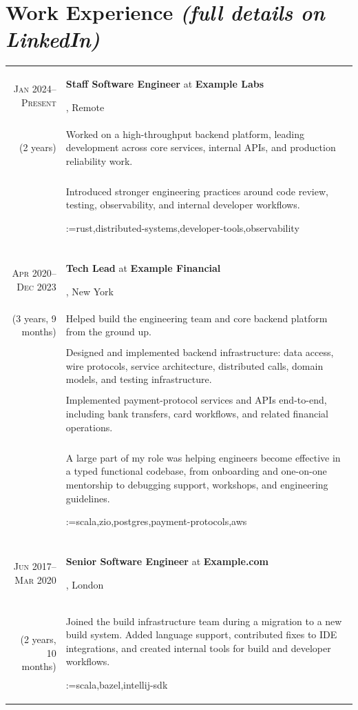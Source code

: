 \documentclass[a4paper,11pt]{article}
\makeatletter
\newcommand{\sotag}[1]{\tikz[baseline]{\node[anchor=base, rounded corners=0.5ex, text height=1.5ex, text depth=.25ex, fill=tagbg, draw=tagbg, text=tagtxt] {#1};}}
\newcommand{\sotagrow}[1]{\par\vspace{4pt}\noindent\@for\sotagitem:=#1\do{\sotag{\sotagitem} }\\}
\newcommand{\job}[2]{\large\sffamily \textbf{#1} at \textbf{#2}\rule[-0.45em]{0pt}{1.45em}}
\newcommand{\sep}{\multicolumn{2}{c}{}\\}
\makeatother
\begin{document}
\section{Work Experience \hfill{\normalfont\footnotesize\itshape (full details on LinkedIn)}}
\begin{longtable}{r|p{}}

  \textsc{Jan 2024--Present} & \job{Staff Software Engineer}{Example Labs}, Remote \\(2 years)
    &Worked on a high-throughput backend platform, leading development across core services, internal APIs, and production reliability work.\\&\\
    &Introduced stronger engineering practices around code review, testing, observability, and internal developer workflows.\sotagrow{rust,distributed-systems,developer-tools,observability}\sep

  \textsc{Apr 2020--Dec 2023} & \job{Tech Lead}{Example Financial}, New York \\(3 years, 9 months)
    &Helped build the engineering team and core backend platform from the ground up.\\&\\
    &Designed and implemented backend infrastructure: data access, wire protocols, service architecture, distributed calls, domain models, and testing infrastructure.\\&\\
    &Implemented payment-protocol services and APIs end-to-end, including bank transfers, card workflows, and related financial operations.\\&\\
    &A large part of my role was helping engineers become effective in a typed functional codebase, from onboarding and one-on-one mentorship to debugging support, workshops, and engineering guidelines.\sotagrow{scala,zio,postgres,payment-protocols,aws}\sep

  \textsc{Jun 2017--Mar 2020} & \job{Senior Software Engineer}{Example.com}, London \\(2 years, 10 months)
    &Joined the build infrastructure team during a migration to a new build system. Added language support, contributed fixes to IDE integrations, and created internal tools for build and developer workflows.\sotagrow{scala,bazel,intellij-sdk}
\end{longtable}

\newpage
\begingroup
\titlespacing{\section}{0pt}{1.4em}{6pt}
\end{document}
